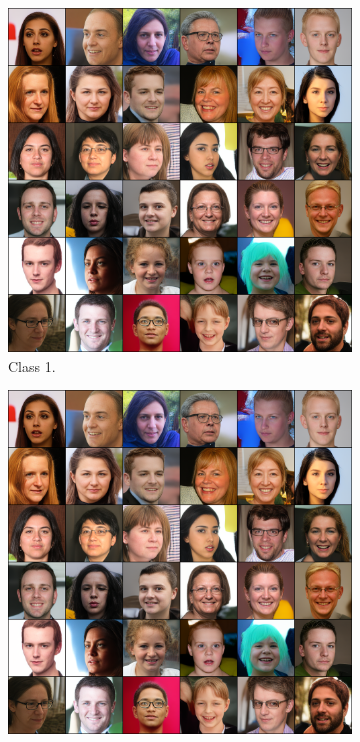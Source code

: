\begin{figure}[ht]
    \centering
    \begin{subfigure}[b]{0.47\textwidth}
        \centering
        \includegraphics[width=1.0\textwidth]{figures/ffhq256-samples.png}
        \caption{
            Class 1.
        }
    \end{subfigure}
    \hfill
    \begin{subfigure}[b]{0.47\textwidth}
        \centering
        \includegraphics[width=1.0\textwidth]{figures/ffhq256-samples.png}

\end{subfigure}
\end{figure}
